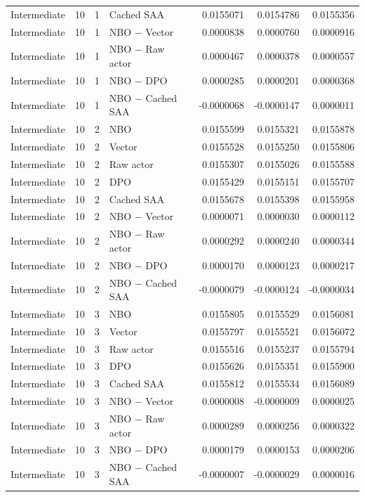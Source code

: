 \begin{longtable}{llrlrrr}
Intermediate & 10 & 1 & Cached SAA & 0.0155071 & 0.0154786 & 0.0155356 \\
Intermediate & 10 & 1 & NBO $-$ Vector & 0.0000838 & 0.0000760 & 0.0000916 \\
Intermediate & 10 & 1 & NBO $-$ Raw actor & 0.0000467 & 0.0000378 & 0.0000557 \\
Intermediate & 10 & 1 & NBO $-$ DPO & 0.0000285 & 0.0000201 & 0.0000368 \\
Intermediate & 10 & 1 & NBO $-$ Cached SAA & -0.0000068 & -0.0000147 & 0.0000011 \\
Intermediate & 10 & 2 & NBO & 0.0155599 & 0.0155321 & 0.0155878 \\
Intermediate & 10 & 2 & Vector & 0.0155528 & 0.0155250 & 0.0155806 \\
Intermediate & 10 & 2 & Raw actor & 0.0155307 & 0.0155026 & 0.0155588 \\
Intermediate & 10 & 2 & DPO & 0.0155429 & 0.0155151 & 0.0155707 \\
Intermediate & 10 & 2 & Cached SAA & 0.0155678 & 0.0155398 & 0.0155958 \\
Intermediate & 10 & 2 & NBO $-$ Vector & 0.0000071 & 0.0000030 & 0.0000112 \\
Intermediate & 10 & 2 & NBO $-$ Raw actor & 0.0000292 & 0.0000240 & 0.0000344 \\
Intermediate & 10 & 2 & NBO $-$ DPO & 0.0000170 & 0.0000123 & 0.0000217 \\
Intermediate & 10 & 2 & NBO $-$ Cached SAA & -0.0000079 & -0.0000124 & -0.0000034 \\
Intermediate & 10 & 3 & NBO & 0.0155805 & 0.0155529 & 0.0156081 \\
Intermediate & 10 & 3 & Vector & 0.0155797 & 0.0155521 & 0.0156072 \\
Intermediate & 10 & 3 & Raw actor & 0.0155516 & 0.0155237 & 0.0155794 \\
Intermediate & 10 & 3 & DPO & 0.0155626 & 0.0155351 & 0.0155900 \\
Intermediate & 10 & 3 & Cached SAA & 0.0155812 & 0.0155534 & 0.0156089 \\
Intermediate & 10 & 3 & NBO $-$ Vector & 0.0000008 & -0.0000009 & 0.0000025 \\
Intermediate & 10 & 3 & NBO $-$ Raw actor & 0.0000289 & 0.0000256 & 0.0000322 \\
Intermediate & 10 & 3 & NBO $-$ DPO & 0.0000179 & 0.0000153 & 0.0000206 \\
Intermediate & 10 & 3 & NBO $-$ Cached SAA & -0.0000007 & -0.0000029 & 0.0000016 \\

\end{longtable}
